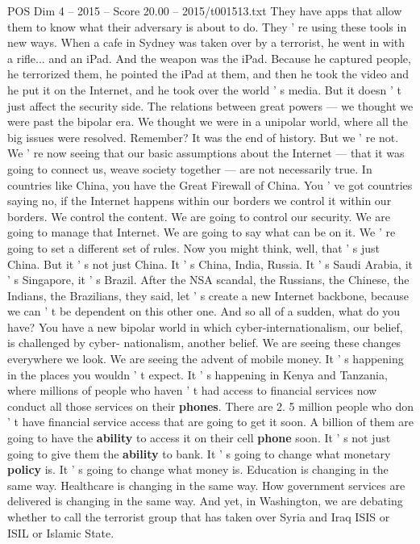 \begin{textsample}{POS Dim 4 – 2015 – Score 20.00 – 2015/t001513.txt}
They have apps that allow them to know what their adversary is about to do.
They ' re using these tools in new ways.
When a cafe in Sydney was taken over by a terrorist, he went in with a rifle... and an iPad.
And the weapon was the iPad.
Because he captured people, he terrorized them, he pointed the iPad at them, and then he took the video and he put it on the Internet, and he took over the world ' s media.
But it doesn ' t just affect the security side.
The relations between great powers — we thought we were past the bipolar era.
We thought we were in a unipolar world, where all the big issues were resolved.
Remember?
It was the end of history.
But we ' re not.
We ' re now seeing that our basic assumptions about the Internet — that it was going to connect us, weave society together — are not necessarily true.
In countries like China, you have the Great Firewall of China.
You ' ve got countries saying no, if the Internet happens within our borders we control it within our borders.
We control the content.
We are going to control our security.
We are going to manage that Internet.
We are going to say what can be on it.
We ' re going to set a different set of rules.
Now you might think, well, that ' s just China.
But it ' s not just China.
It ' s China, India, Russia.
It ' s Saudi Arabia, it ' s Singapore, it ' s Brazil.
After the NSA scandal, the Russians, the Chinese, the Indians, the Brazilians, they said, let ' s create a new Internet backbone, because we can ' t be dependent on this other one.
And so all of a sudden, what do you have?
You have a new bipolar world in which cyber-internationalism, our belief, is challenged by cyber- nationalism, another belief.
We are seeing these changes everywhere we look.
We are seeing the advent of mobile money.
It ' s happening in the places you wouldn ' t expect.
It ' s happening in Kenya and Tanzania, where millions of people who haven ' t had access to financial services now conduct all those services on their \textbf{phones}.
There are 2. 5 million people who don ' t have financial service access that are going to get it soon.
A billion of them are going to have the \textbf{ability} to access it on their cell \textbf{phone} soon.
It ' s not just going to give them the \textbf{ability} to bank.
It ' s going to change what monetary \textbf{policy} is.
It ' s going to change what money is.
Education is changing in the same way.
Healthcare is changing in the same way.
How government services are delivered is changing in the same way.
And yet, in Washington, we are debating whether to call the terrorist group that has taken over Syria and Iraq ISIS or ISIL or Islamic State.

\end{textsample}
